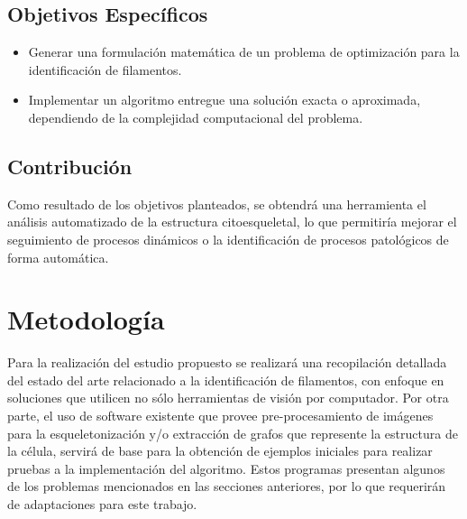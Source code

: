 \documentclass{article}
\begin{document}
\subsection{Objetivos Espec\'ificos}
\begin{itemize}
    \item Generar una formulaci\'on matem\'atica de un problema de optimizaci\'on para la identificaci\'on de filamentos. 
    \item Implementar un algoritmo entregue una soluci\'on exacta o aproximada, dependiendo de la complejidad computacional del problema. 
\end{itemize}

\subsection{Contribuci\'on}

Como resultado de los objetivos planteados, se obtendr\'a una herramienta el an\'alisis automatizado de la estructura citoesqueletal, lo que permitir\'ia mejorar el seguimiento de procesos din\'amicos o la identificaci\'on de procesos patol\'ogicos de forma autom\'atica.

\section{Metodolog\'ia}

Para la realizaci\'on del estudio propuesto se realizar\'a una recopilaci\'on detallada del estado del arte relacionado a la identificaci\'on de filamentos, con enfoque en soluciones que utilicen no s\'olo herramientas de visi\'on por computador.
Por otra parte, el uso de software existente que provee pre-procesamiento de im\'agenes para la esqueletonizaci\'on y/o extracción de grafos que represente la estructura de la c\'elula, servir\'a de base para la obtenci\'on de ejemplos iniciales para realizar pruebas a la implementaci\'on del algoritmo. Estos programas presentan algunos de los problemas mencionados en las secciones anteriores, por lo que requerir\'an de adaptaciones para este trabajo.  
\end{document}
